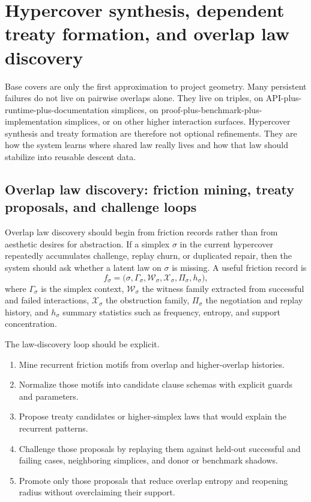 \documentclass[11pt]{report}
\begin{document}
\chapter{Hypercover synthesis, dependent treaty formation, and overlap law discovery}
Base covers are only the first approximation to project geometry. Many persistent failures do not live on pairwise overlaps alone. They live on triples, on API-plus-runtime-plus-documentation simplices, on proof-plus-benchmark-plus-implementation simplices, or on other higher interaction surfaces. Hypercover synthesis and treaty formation are therefore not optional refinements. They are how the system learns where shared law really lives and how that law should stabilize into reusable descent data.

\section{Overlap law discovery: friction mining, treaty proposals, and challenge loops}
Overlap law discovery should begin from friction records rather than from aesthetic desires for abstraction. If a simplex $\sigma$ in the current hypercover repeatedly accumulates challenge, replay churn, or duplicated repair, then the system should ask whether a latent law on $\sigma$ is missing. A useful friction record is
\[
f_\sigma
=
\bigl(
\sigma,
\Gamma_\sigma,
\mathcal{W}_\sigma,
\mathcal{X}_\sigma,
\Pi_\sigma,
h_\sigma
\bigr),
\]
where $\Gamma_\sigma$ is the simplex context, $\mathcal{W}_\sigma$ the witness family extracted from successful and failed interactions, $\mathcal{X}_\sigma$ the obstruction family, $\Pi_\sigma$ the negotiation and replay history, and $h_\sigma$ summary statistics such as frequency, entropy, and support concentration.

The law-discovery loop should be explicit.
\begin{enumerate}
\item Mine recurrent friction motifs from overlap and higher-overlap histories.
\item Normalize those motifs into candidate clause schemas with explicit guards and parameters.
\item Propose treaty candidates or higher-simplex laws that would explain the recurrent patterns.
\item Challenge those proposals by replaying them against held-out successful and failing cases, neighboring simplices, and donor or benchmark shadows.
\item Promote only those proposals that reduce overlap entropy and reopening radius without overclaiming their support.
\end{enumerate}
\end{document}
